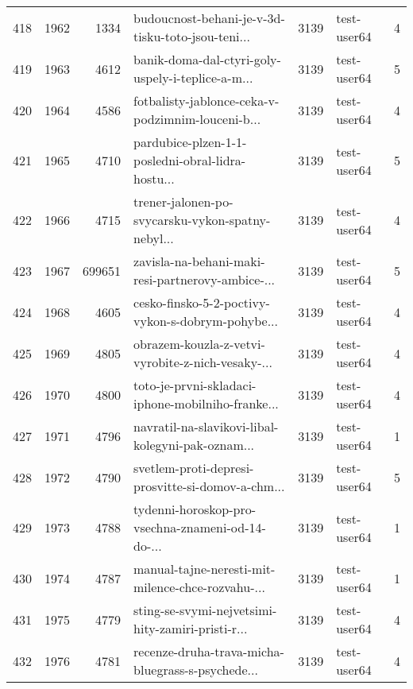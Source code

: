 \begin{tabular}{lrrlrlr}
418  &       1962 &     1334 &  budoucnost-behani-je-v-3d-tisku-toto-jsou-teni... &     3139 &                  test-user64 &               4 \\
419  &       1963 &     4612 &  banik-doma-dal-ctyri-goly-uspely-i-teplice-a-m... &     3139 &                  test-user64 &               5 \\
420  &       1964 &     4586 &  fotbalisty-jablonce-ceka-v-podzimnim-louceni-b... &     3139 &                  test-user64 &               4 \\
421  &       1965 &     4710 &  pardubice-plzen-1-1-posledni-obral-lidra-hostu... &     3139 &                  test-user64 &               5 \\
422  &       1966 &     4715 &  trener-jalonen-po-svycarsku-vykon-spatny-nebyl... &     3139 &                  test-user64 &               4 \\
423  &       1967 &   699651 &  zavisla-na-behani-maki-resi-partnerovy-ambice-... &     3139 &                  test-user64 &               5 \\
424  &       1968 &     4605 &  cesko-finsko-5-2-poctivy-vykon-s-dobrym-pohybe... &     3139 &                  test-user64 &               4 \\
425  &       1969 &     4805 &  obrazem-kouzla-z-vetvi-vyrobite-z-nich-vesaky-... &     3139 &                  test-user64 &               4 \\
426  &       1970 &     4800 &  toto-je-prvni-skladaci-iphone-mobilniho-franke... &     3139 &                  test-user64 &               4 \\
427  &       1971 &     4796 &  navratil-na-slavikovi-libal-kolegyni-pak-oznam... &     3139 &                  test-user64 &               1 \\
428  &       1972 &     4790 &  svetlem-proti-depresi-prosvitte-si-domov-a-chm... &     3139 &                  test-user64 &               5 \\
429  &       1973 &     4788 &  tydenni-horoskop-pro-vsechna-znameni-od-14-do-... &     3139 &                  test-user64 &               1 \\
430  &       1974 &     4787 &  manual-tajne-neresti-mit-milence-chce-rozvahu-... &     3139 &                  test-user64 &               1 \\
431  &       1975 &     4779 &  sting-se-svymi-nejvetsimi-hity-zamiri-pristi-r... &     3139 &                  test-user64 &               4 \\
432  &       1976 &     4781 &  recenze-druha-trava-micha-bluegrass-s-psychede... &     3139 &                  test-user64 &               4 \\

\end{tabular}

